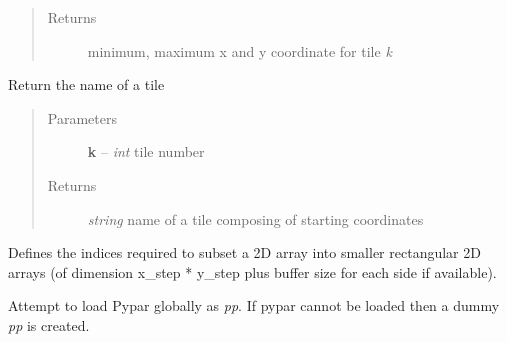 \documentclass[letterpaper,10pt,english]{sphinxmanual}
\begin{document}
\begin{fulllineitems}
\begin{fulllineitems}
\begin{quote}
\begin{description}
\item[{Returns}] \leavevmode
minimum, maximum x and y coordinate for tile \emph{k}

\end{description}\end{quote}

\end{fulllineitems}



\begin{fulllineitems}
\label{docs/all_multipliers:all_multipliers.TileGrid.get_tilename}
Return the name of a tile
\begin{quote}\begin{description}
\item[{Parameters}] \leavevmode
\textbf{k} -- \emph{int} tile number

\item[{Returns}] \leavevmode
\emph{string} name of a tile composing of starting coordinates

\end{description}\end{quote}

\end{fulllineitems}



\begin{fulllineitems}
\label{docs/all_multipliers:all_multipliers.TileGrid.tile_grid}
Defines the indices required to subset a 2D array into smaller
rectangular 2D arrays (of dimension x\_step * y\_step plus buffer
size for each side if available).

\end{fulllineitems}


\end{fulllineitems}



\begin{fulllineitems}
\label{docs/all_multipliers:all_multipliers.attempt_parallel}
Attempt to load Pypar globally as \emph{pp}.  If pypar cannot be loaded then a
dummy \emph{pp} is created.

\end{fulllineitems}
\end{document}
